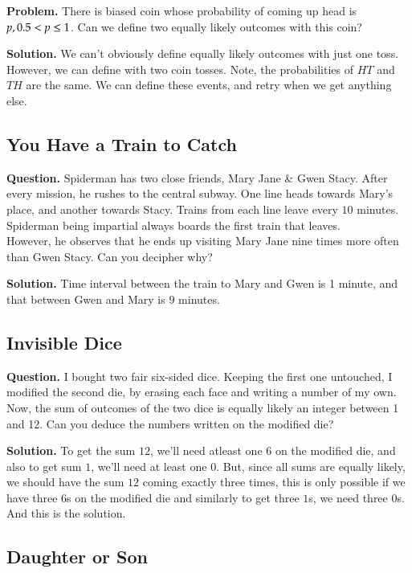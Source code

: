\textbf{Problem.} There is biased coin whose probability of coming up head is $p, \space 0.5 < p \leq 1$. Can we define two equally likely outcomes with this coin? 

\textbf{Solution.} We can't obviously define equally likely outcomes with just one toss. However, we can define with two coin tosses. Note, the probabilities of $HT$ and $TH$ are the same.  We can define these events, and retry when we get anything else.


\subsection{You Have a Train to Catch}

\textbf{Question.} Spiderman has two close friends, Mary Jane \& Gwen Stacy. After every mission, he rushes to the central subway. One line heads towards Mary's place, and another towards Stacy. Trains from each line leave every $10$ minutes. Spiderman being impartial always boards the first train that leaves.\\
However, he observes that he ends up visiting Mary Jane nine times more often than Gwen Stacy. Can you decipher why?

\textbf{Solution.} Time interval between the train to Mary and Gwen is 1 minute, and that between Gwen and Mary is $9$ minutes.

\subsection{Invisible Dice}

\textbf{Question.} I bought two fair six-sided dice. Keeping the first one untouched, I modified the second die, by erasing each face and writing a number of my own. Now, the sum of outcomes of the two dice is equally likely an integer between 1 and 12. Can you deduce the numbers written on the modified die?

\textbf{Solution.} To get the sum $12$, we'll need atleast one $6$ on the modified die, and also to get sum $1$, we'll need at least one $0$. But, since all sums are equally likely, we should have the sum $12$ coming exactly three times, this is only possible if we have three $6$s on the modified die and similarly to get three $1$s, we need three $0$s. And this is the  solution.

\subsection{Daughter or Son}

